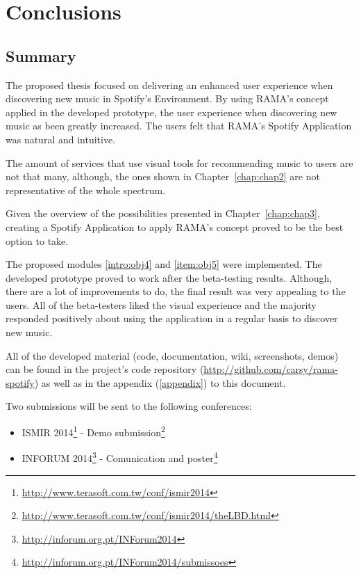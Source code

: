 
\chapter{Conclusions}
\label{chap:chap5}

\section*{}


\section{Summary} %
\label{sec:summary}

  The proposed thesis focused on delivering an enhanced user experience when discovering new music in Spotify's Environment.
  By using RAMA's concept applied in the developed prototype, the user experience when discovering new music as been greatly increased.
  The users felt that RAMA's Spotify Application was natural and intuitive.

  The amount of services that use visual tools for recommending music to users are not that many, although, the ones shown in Chapter~\ref{chap:chap2} are not representative of the whole spectrum.

  Given the overview of the possibilities presented in Chapter~\ref{chap:chap3}, creating a Spotify Application to apply RAMA's concept proved to be the best option to take.

  The proposed modules \ref{intro:obj4} and \ref{item:obj5} were implemented.
  The developed prototype proved to work after the beta-testing results.
  Although, there are a lot of improvements to do, the final result was very appealing to the users.
  All of the beta-testers liked the visual experience and the majority responded positively about using the application in a regular basis to discover new music.

  All of the developed material (code, documentation, wiki, screenshots, demos) can be found in the project's code repository (\url{http://github.com/carsy/rama-spotify}) as well as in the appendix (\ref{appendix}) to this document.

  Two submissions will be sent to the following conferences:
  \begin{itemize}
    \item ISMIR 2014\footnote{\url{http://www.terasoft.com.tw/conf/ismir2014}} - Demo submission\footnote{\url{http://www.terasoft.com.tw/conf/ismir2014/theLBD.html}}
    \item INFORUM 2014\footnote{\url{http://inforum.org.pt/INForum2014}} - Comunication and poster\footnote{\url{http://inforum.org.pt/INForum2014/submissoes}}
  \end{itemize}


